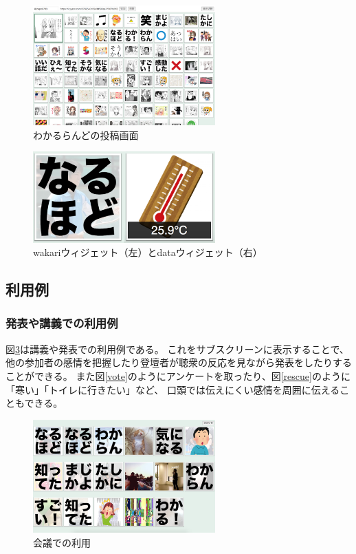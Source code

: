 \begin{figure}[h]
\centering
\includegraphics[width=7cm]{images/console.eps}
\caption{わかるらんどの投稿画面}
\label{console}
\end{figure}

\begin{figure}[h]
\centering
\includegraphics[width=7cm]{images/widget.eps}
\caption{wakariウィジェット（左）とdataウィジェット（右）}
\label{widget}
\end{figure}

\subsection{利用例}

\subsubsection{発表や講義での利用例}

図\ref{discussion}は講義や発表での利用例である。
これをサブスクリーンに表示することで、他の参加者の感情を把握したり登壇者が聴衆の反応を見ながら発表をしたりすることができる。
また図\ref{vote}のようにアンケートを取ったり、図\ref{rescue}のように「寒い」「トイレに行きたい」など、
口頭では伝えにくい感情を周囲に伝えることもできる。

\begin{figure}[h]
\centering
\includegraphics[width=7cm]{images/discussion.eps}
\caption{会議での利用}
\label{discussion}
\end{figure}


